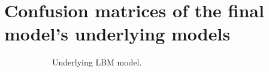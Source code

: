 \clearpage
\section*{Confusion matrices of the final model's underlying models}

\begin{figure}[ht]
    \centering
    \begin{subfigure}{.45\textwidth}
        \centering
        \captionsetup{width=0.8\linewidth}
        \captionsetup{justification=centering}
        \caption{Underlying LBM model.}
    \end{subfigure}
    \hspace{1cm}
    \begin{subfigure}{.45\textwidth}
        \centering

\end{subfigure}
\end{figure}
